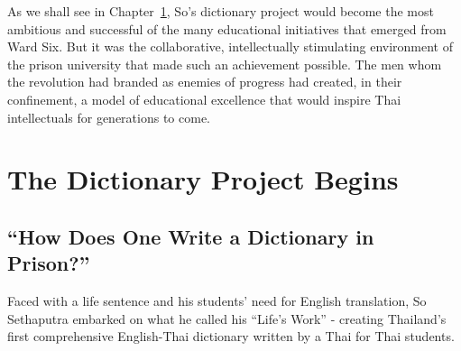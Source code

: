 \documentclass[
  Letterpaper,
]{scrbook}
\begin{document}
As we shall see in Chapter~\ref{sec-dictionary-begins}, So's dictionary
project would become the most ambitious and successful of the many
educational initiatives that emerged from Ward Six. But it was the
collaborative, intellectually stimulating environment of the prison
university that made such an achievement possible. The men whom the
revolution had branded as enemies of progress had created, in their
confinement, a model of educational excellence that would inspire Thai
intellectuals for generations to come.


\chapter{The Dictionary Project Begins}\label{sec-dictionary-begins}

\section{``How Does One Write a Dictionary in
Prison?''}\label{how-does-one-write-a-dictionary-in-prison}

Faced with a life sentence and his students' need for English
translation, So Sethaputra embarked on what he called his ``Life's
Work'' - creating Thailand's first comprehensive English-Thai dictionary
written by a Thai for Thai students.
\end{document}
